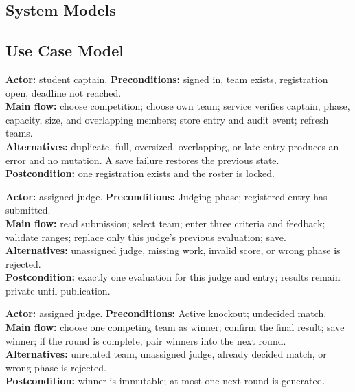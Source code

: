 \begin{umlpage}
\section{System Models}
\subsection{Use Case Model}
\end{umlpage}
\begin{contentbox}
\textbf{Actor:} student captain. \textbf{Preconditions:} signed in, team exists, registration open, deadline not reached.\\
\textbf{Main flow:} choose competition; choose own team; service verifies captain, phase, capacity, size, and overlapping members; store entry and audit event; refresh teams.\\
\textbf{Alternatives:} duplicate, full, oversized, overlapping, or late entry produces an error and no mutation. A save failure restores the previous state.\\
\textbf{Postcondition:} one registration exists and the roster is locked.
\end{contentbox}
\begin{contentbox}
\textbf{Actor:} assigned judge. \textbf{Preconditions:} Judging phase; registered entry has submitted.\\
\textbf{Main flow:} read submission; select team; enter three criteria and feedback; validate ranges; replace only this judge's previous evaluation; save.\\
\textbf{Alternatives:} unassigned judge, missing work, invalid score, or wrong phase is rejected.\\
\textbf{Postcondition:} exactly one evaluation for this judge and entry; results remain private until publication.
\end{contentbox}
\begin{contentbox}
\textbf{Actor:} assigned judge. \textbf{Preconditions:} Active knockout; undecided match.\\
\textbf{Main flow:} choose one competing team as winner; confirm the final result; save winner; if the round is complete, pair winners into the next round.\\
\textbf{Alternatives:} unrelated team, unassigned judge, already decided match, or wrong phase is rejected.\\
\textbf{Postcondition:} winner is immutable; at most one next round is generated.
\end{contentbox}
